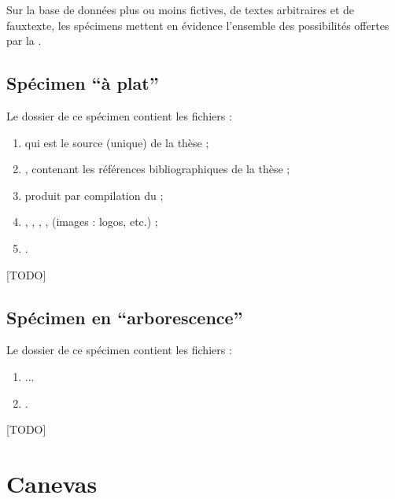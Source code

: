 Sur la base de données plus ou moins fictives, de textes arbitraires et de
\gls{fauxtexte}, les spécimens mettent en évidence l'ensemble des possibilités
offertes par la \yatcl{}.

\subsection[Spécimen \enquote{à plat}]{Spécimen \enquote{à plat} }
\label{sec-specimen-a-plat}


Le dossier de ce spécimen %
contient les fichiers :
\begin{enumerate}
\item {} qui est le source  (unique) de la thèse ;
\item {}, contenant les références bibliographiques de
  la thèse ;
\item {} produit par compilation du  ;
\item {}, , , ,
   (images : logos, etc.) ;
\item {}.
\end{enumerate}

[TODO]

\subsection[Spécimen en \enquote{arborescence}]{Spécimen en \enquote{arborescence} }
\label{sec-specimen-arborescence}


Le dossier de ce spécimen %
contient les fichiers :
\begin{enumerate}
\item ...
\item {}.
\end{enumerate}

[TODO]

\section{Canevas}
\label{sec-canevas}

